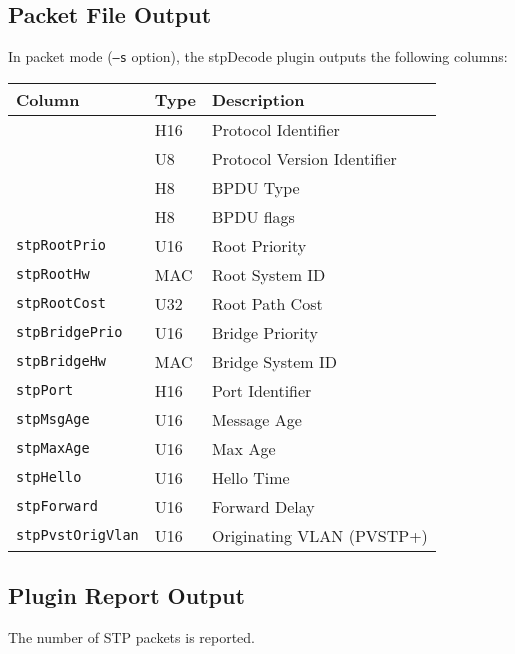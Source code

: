 \documentclass[documentation]{subfiles}
\begin{document}
\subsection{Packet File Output}
In packet mode ({\tt --s} option), the stpDecode plugin outputs the following columns:
\begin{longtable}{lll}
    \toprule
    {\bf Column} & {\bf Type} & {\bf Description}\\%
    \midrule\endhead%
    {\tt \nameref{stpProto}}   & H16 & Protocol Identifier\\
    {\tt \nameref{stpVersion}} & U8  & Protocol Version Identifier\\
    {\tt \nameref{stpType}}    & H8  & BPDU Type\\
    {\tt \nameref{stpFlags}}   & H8  & BPDU flags\\
    {\tt stpRootPrio}          & U16 & Root Priority\\
    {\tt stpRootHw}            & MAC & Root System ID\\
    {\tt stpRootCost}          & U32 & Root Path Cost\\
    {\tt stpBridgePrio}        & U16 & Bridge Priority\\
    {\tt stpBridgeHw}          & MAC & Bridge System ID\\
    {\tt stpPort}              & H16 & Port Identifier\\
    {\tt stpMsgAge}            & U16 & Message Age\\
    {\tt stpMaxAge}            & U16 & Max Age\\
    {\tt stpHello}             & U16 & Hello Time\\
    {\tt stpForward}           & U16 & Forward Delay\\
	{\tt stpPvstOrigVlan}      & U16 & Originating VLAN (PVSTP+)\\
    \bottomrule
\end{longtable}

\subsection{Plugin Report Output}
The number of STP packets is reported.
\end{document}
